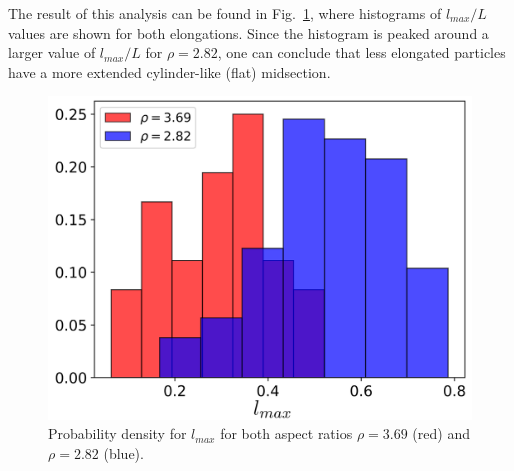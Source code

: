 \documentclass[aip,graphicx]{revtex4-1} %
\begin{document}
The result of this analysis can be found in Fig.~\ref{fig:maxlength_div}, where histograms of $l_{max}/L$ values are shown
for both elongations. Since the histogram is peaked around a larger value of $l_{max}/L$ for $\rho=2.82$, one can conclude
that less elongated particles have a more extended cylinder-like (flat) midsection. 

\begin{figure}
    \centering
    \includegraphics[width=0.5\columnwidth]{maxlength_div.png}
    \caption{Probability density for $l_{max}$ for both aspect ratios $\rho=3.69$ (red) and $\rho=2.82$ (blue).}\label{fig:maxlength_div}
\end{figure}


\end{document}
